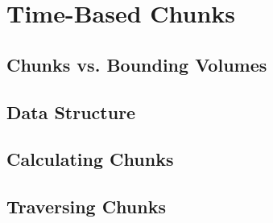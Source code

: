 \chapter{Time-Based Chunks}

\section{Chunks vs. Bounding Volumes}

\section{Data Structure}

\section{Calculating Chunks}

\section{Traversing Chunks}